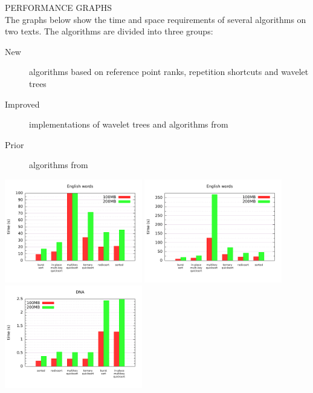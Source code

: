 {\sffamily\normalsize{\color{sciorange} PERFORMANCE GRAPHS}}\vspace{1mm}\\
\footnotesize 
The graphs below show the time and space requirements of several
algorithms on two texts.  The algorithms are divided
into three groups:
\begin{description}
\item[\color{new}New] algorithms based on reference point ranks, repetition
shortcuts and wavelet trees
\item[\color{improved}Improved] implementations of wavelet trees and
algorithms from~\cite{ll2005}
\item[\color{prior}Prior] algorithms from~\cite{s2001,ll2005}
\end{description}
\vspace{2mm}
\includegraphics[width=60mm]{words-0-100.pdf}
\includegraphics[width=60mm]{words-0-400.pdf}
\includegraphics[width=60mm]{dna.pdf}

